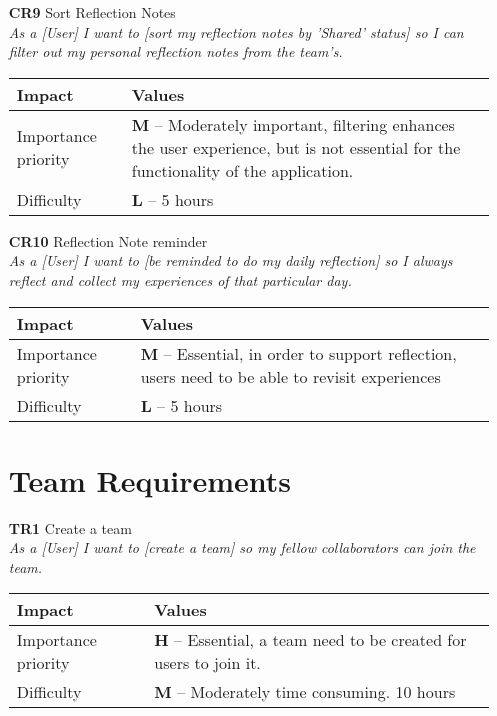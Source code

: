 \begin{itemize}
    \item[\textbf{CR9}] Sort Reflection Notes\\
        \textit{\small{As a [User] I want to [sort my reflection notes by 'Shared' status] so I can filter out my personal reflection notes from the team's.}}

        \begin{tabular}{| l | p{8cm} |}
            \hline
            \rowcolor[gray]{0.8}
            \textbf{Impact} & \textbf{Values} \\
            \hline
            Importance priority & \textbf{M} -- Moderately important, filtering enhances the user experience, but is not essential for the functionality of the application.\\
            Difficulty & \textbf{L} -- 5 hours\\
            \hline
        \end{tabular}
    \vspace{0.5cm}

    \item[\textbf{CR10}] Reflection Note reminder\\
        \textit{\small{As a [User] I want to [be reminded to do my daily reflection] so I always reflect and collect my experiences of that particular day.}}

        \begin{tabular}{| l | p{8cm} |}
            \hline
            \rowcolor[gray]{0.8}
            \textbf{Impact} & \textbf{Values} \\
            \hline
            Importance priority & \textbf{M} -- Essential, in order to support reflection, users need to be able to revisit experiences\\
            Difficulty & \textbf{L} -- 5 hours\\
            \hline
        \end{tabular}
    \vspace{0.5cm}

    \section{Team Requirements}
    \item[\textbf{TR1}] Create a team\\
        \textit{\small{As a [User] I want to [create a team] so my fellow collaborators can join the team.}}

        \begin{tabular}{| l | p{8cm} |}
            \hline
            \rowcolor[gray]{0.8}
            \textbf{Impact} & \textbf{Values} \\
            \hline
            Importance priority & \textbf{H} -- Essential, a team need to be created for users to join it.\\
            Difficulty & \textbf{M} -- Moderately time consuming. 10 hours\\
            \hline
        \end{tabular}
    \vspace{0.5cm}


\end{itemize}
